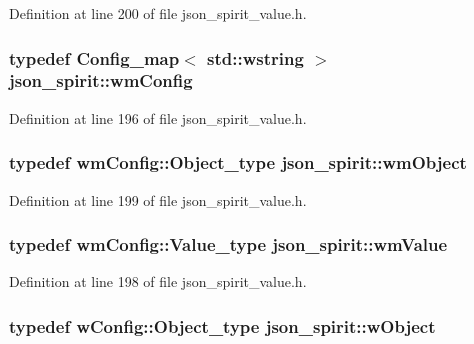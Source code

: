 Definition at line 200 of file json\+\_\+spirit\+\_\+value.\+h.

\hypertarget{namespacejson__spirit_a7a9abcf0ae8c9bc1d946c10e935c28c6}{}
\subsubsection[{wm\+Config}]{\setlength{\rightskip}{0pt plus 5cm}typedef {\bf Config\+\_\+map}$<$ std\+::wstring $>$ {\bf json\+\_\+spirit\+::wm\+Config}}\label{namespacejson__spirit_a7a9abcf0ae8c9bc1d946c10e935c28c6}


Definition at line 196 of file json\+\_\+spirit\+\_\+value.\+h.

\hypertarget{namespacejson__spirit_a485c7d9bf9e138b0b89ec61a03dc6c2a}{}
\subsubsection[{wm\+Object}]{\setlength{\rightskip}{0pt plus 5cm}typedef {\bf wm\+Config\+::\+Object\+\_\+type} {\bf json\+\_\+spirit\+::wm\+Object}}\label{namespacejson__spirit_a485c7d9bf9e138b0b89ec61a03dc6c2a}


Definition at line 199 of file json\+\_\+spirit\+\_\+value.\+h.

\hypertarget{namespacejson__spirit_a2b6befe411be23e2a1a9ca590ef212b5}{}
\subsubsection[{wm\+Value}]{\setlength{\rightskip}{0pt plus 5cm}typedef {\bf wm\+Config\+::\+Value\+\_\+type} {\bf json\+\_\+spirit\+::wm\+Value}}\label{namespacejson__spirit_a2b6befe411be23e2a1a9ca590ef212b5}


Definition at line 198 of file json\+\_\+spirit\+\_\+value.\+h.

\hypertarget{namespacejson__spirit_a0f2593cf7c48c581b018a80cd2400c22}{}
\subsubsection[{w\+Object}]{\setlength{\rightskip}{0pt plus 5cm}typedef {\bf w\+Config\+::\+Object\+\_\+type} {\bf json\+\_\+spirit\+::w\+Object}}\label{namespacejson__spirit_a0f2593cf7c48c581b018a80cd2400c22}


